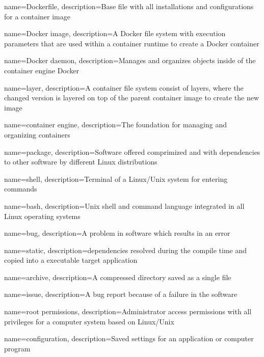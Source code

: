 {
    name={Dockerfile},
    description={Base file with all installations and configurations for a container image}
}

{
    name={Docker image},
    description={A Docker file system with execution parameters that are used within a container runtime to create a Docker container}
}

{
    name={Docker daemon},
    description={Manages and organizes objects inside of the container engine Docker}
}

{
    name={layer},
    description={A container file system consist of layers, where the changed version is layered on top of the parent container image to create the new image}
}

{
    name={container engine},
    description={The foundation for managing and organizing containers}
}

{
    name={package},
    description={Software offered comprimized and with dependencies to other software by different Linux distributions}
}

{
    name={shell},
    description={Terminal of a Linux/Unix system for entering commands}
}

{
    name={bash},
    description={Unix shell and command language integrated in all Linux operating systems}
}

{
    name={bug},
    description={A problem in software which results in an error}
}

{
    name={static},
    description={dependencies resolved during the compile time and copied into a executable target application}
}

{
    name={archive},
    description={A compressed directory saved as a single file}
}

{
    name={issue},
    description={A bug report because of a failure in the software}
}

{
    name={root permissions},
    description={Administrator access permissions with all privileges for a computer system based on Linux/Unix}
}

{
    name={configuration},
    description={Saved settings for an application or computer program}
}

